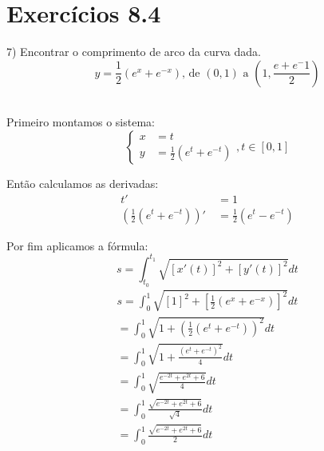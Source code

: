 \documentclass[a4paper,times,12pt]{article}
\begin{document}
\section{Exerc\'{i}cios 8.4}
\hspace*{+15pt} 7) Encontrar o comprimento de arco da curva dada.
\[ y=\frac{1}{2}\left(e^{x}+e^{-x}\right)\text{, de }\left(0,1\right)\text{ a }\left(1,\frac{e+e^-1}{2}\right) \]
\\
\par Primeiro montamos o sistema:
\[
	\begin{cases}
		x&=t \\
		y&=\frac{1}{2}\left(e^{t}+e^{-t}\right)
	\end{cases}
	,t\in[0,1]
\]
\par Então calculamos as derivadas:
\begin{align*}
	t'\:&=1 \\
	\left(\frac{1}{2}\left(e^t+e^{-t}\right)\right)'\:&=\frac{1}{2}\left(e^t-e^{-t}\right)
\end{align*}
\par Por fim aplicamos a fórmula:
\[
	s=\int_{t_0}^{t_1}\sqrt{[x'(t)]^2+[y'(t)]^2}dt
\]
\begin{gather*}
	s = \int_0^1\sqrt{[1]^2+[\frac{1}{2}(e^x+e^{-x})]^2}dt \\
	=\int_0^1\sqrt{1+\left(\frac{1}{2}\left(e^t+e^{-t}\right)\right)^2}dt \\
	=\int_0^1\sqrt{1+\frac{\left(e^t+e^{-t}\right)^2}{4}}dt \\
	=\int_0^1\sqrt{\frac{e^{-2t}+e^{2t}+6}{4}}dt \\
	=\int_0^1\frac{\sqrt{e^{-2t}+e^{2t}+6}}{\sqrt{4}}dt \\
	=\int_0^1\frac{\sqrt{e^{-2t}+e^{2t}+6}}{2}dt
\end{gather*}
\newpage
\end{document}
